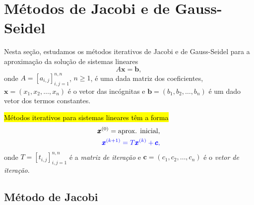 \section{Métodos de Jacobi e de Gauss-Seidel}\label{cap_sislin_sec_jgs}

Nesta seção, estudamos os métodos iterativos de Jacobi{\jacobi} e de Gauss{\gauss}-Seidel{\seidel} para a aproximação da solução de sistemas lineares
\begin{equation}
  A\pmb{x} = \pmb{b},
\end{equation}
onde $A = [a_{i,j}]_{i,j=1}^{n,n}$, $n\geq 1$, é uma dada matriz dos coeficientes, $\pmb{x} = (x_1, x_2, \dotsc, x_n)$ é o vetor das incógnitas e $\pmb{b} = (b_1, b_2, \dotsc, b_n)$ é um dado vetor dos termos constantes.

\hl{Métodos iterativos para sistemas lineares têm a forma}
\begin{align}
  \pmb{x}^{(0)} = \text{aprox. inicial},\\
  \color{blue}\pmb{x}^{(k+1)} = T\pmb{x}^{(k)} + \pmb{c},
\end{align}
onde $T = [t_{i,j}]_{i,j=1}^{n,n}$ é a \emph{matriz de iteração} e $\pmb{c} = (c_1, c_2, \dotsc, c_n)$ é o \emph{vetor de iteração}.

\subsection{Método de Jacobi}

